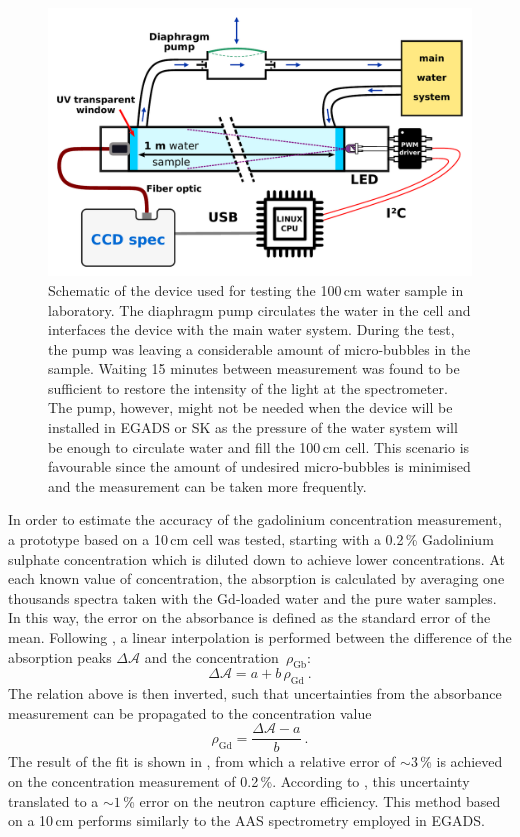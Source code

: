 \begin{figure}
	\centering
	\includegraphics[width=0.7\linewidth]{pics/Device.pdf}
	\caption{Schematic of the device used for testing the 100\,cm water sample in laboratory.
		The diaphragm pump circulates the water in the cell and interfaces the device with the main water system.
		During the test, the pump was leaving a considerable amount of micro-bubbles in the sample.
		Waiting 15 minutes between measurement was found to be sufficient to restore the intensity of the light at %
		the spectrometer.
		The pump, however, might not be needed when the device will be installed in EGADS or SK as the %
		pressure of the water system will be enough to circulate water and fill the 100\,cm cell.
		This scenario is favourable since the amount of undesired micro-bubbles is minimised and the %
		measurement can be taken more frequently.}
	\label{fig:gad_device}
\end{figure}

In order to estimate the accuracy of the gadolinium concentration measurement, %
a prototype based on a 10\,cm cell was tested, starting with a 0.2\,\% Gadolinium sulphate concentration %
which is diluted down to achieve lower concentrations.
At each known value of concentration, the absorption is calculated by averaging one thousands spectra %
taken with the Gd-loaded water and the pure water samples.
In this way, the error on the absorbance is defined as the standard error of the mean.
Following , a linear interpolation is performed between the difference of the absorption peaks %
$\Delta \mathcal{A}$ and the concentration~$\rho_\text{Gb}$: 
\begin{equation}
	\Delta \mathcal{A} = a + b\,\rho_\text{Gd}\ .
\end{equation}
The relation above is then inverted, such that uncertainties from the absorbance measurement %
can be propagated to the concentration value
\begin{equation}
	\rho_\text{Gd} = \frac{\Delta \mathcal{A} - a}{b}\ .
\end{equation}
The result of the fit is shown in , from which a relative error of $\sim3$\,\% %
is achieved on the concentration measurement of 0.2\,\%.
According to , this uncertainty translated to a $\sim1$\,\% error on the neutron capture efficiency.
This method based on a 10\,cm performs similarly to the AAS spectrometry employed in EGADS.

